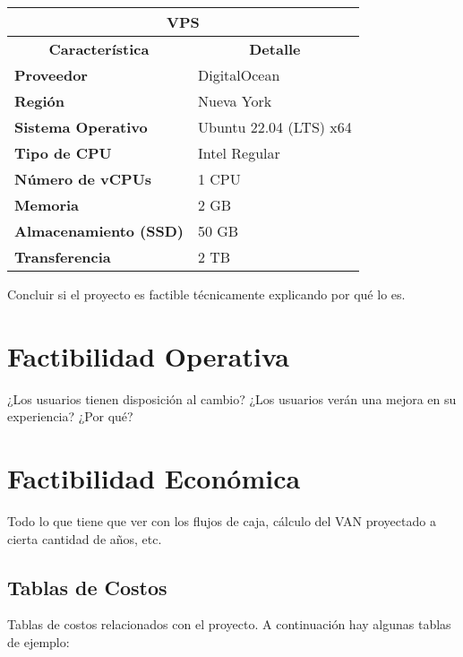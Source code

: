 \begin{center}
	\begin{tabular}{ | l | p{10cm} |}
		\hline
		\multicolumn{2}{|c|}{\textbf{VPS}} \\
		\hline
		\multicolumn{1}{|c|}{\textbf{Característica}} & \multicolumn{1}{|c|}{\textbf{Detalle}} \\
		\hline
		
		{\textbf{Proveedor}} & DigitalOcean \\ \hline
		
		{\textbf{Región}} & Nueva York \\ \hline
		
		{\textbf{Sistema Operativo}} & Ubuntu 22.04 (LTS) x64 \\ \hline
		
		{\textbf{Tipo de CPU}} & Intel Regular \\ \hline
		
		{\textbf{Número de vCPUs}} & 1 CPU\\ \hline
		
		{\textbf{Memoria}} & 2 GB \\ \hline
		
		{\textbf{Almacenamiento (SSD)}} & 50 GB \\ \hline
		
		{\textbf{Transferencia}} & 2 TB \\ \hline
	\end{tabular}
  
  \label{table:vps}
\end{center}

Concluir si el proyecto es factible técnicamente explicando por qué lo es.

\section{Factibilidad Operativa}
¿Los usuarios tienen disposición al cambio? ¿Los usuarios verán una mejora en su experiencia? ¿Por qué?

\section{Factibilidad Económica}
Todo lo que tiene que ver con los flujos de caja, cálculo del VAN proyectado a cierta cantidad de años, etc.

\subsection{Tablas de Costos}
\label{feasibility:costs}
Tablas de costos relacionados con el proyecto. A continuación hay algunas tablas de ejemplo:

